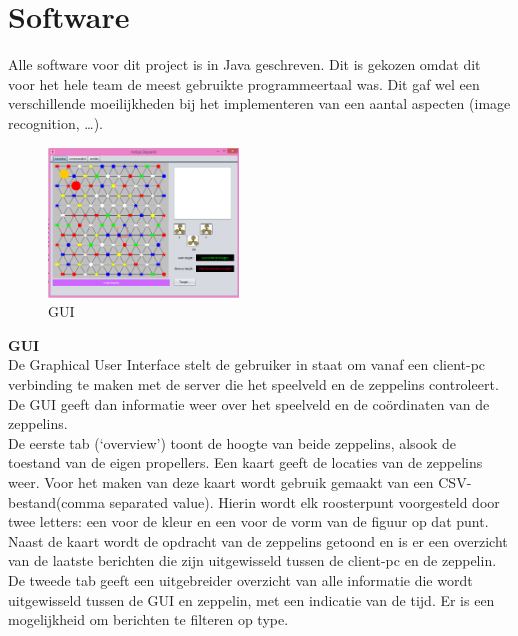 \documentclass[tt]{penoverslag}
\begin{document}
\section{Software}

Alle software voor dit project is in Java geschreven. Dit is gekozen omdat dit voor het hele team de meest gebruikte programmeertaal was. Dit gaf wel een verschillende moeilijkheden bij het implementeren van een aantal aspecten (image recognition, \ldots). \\

\begin{figure}[H]
\begin{center}
\includegraphics[width=0.45\textwidth]{GUI.png}
\end{center}
\caption{GUI}
\label{GUI}
\end{figure}

\textbf{GUI} \\
De Graphical User Interface stelt de gebruiker in staat om vanaf een client-pc verbinding te maken met de server die het speelveld en de zeppelins controleert. De GUI geeft dan informatie weer over het speelveld en de co\"{o}rdinaten van de zeppelins.  \\

De eerste tab (`overview') toont de hoogte van beide zeppelins, alsook de toestand van de eigen propellers. Een kaart geeft de locaties van de zeppelins weer. Voor het maken van deze kaart wordt gebruik gemaakt van een CSV-bestand(comma separated value). Hierin wordt elk roosterpunt voorgesteld door twee letters: een voor de kleur en een voor de vorm van de figuur op dat punt. Naast de kaart wordt de opdracht van de zeppelins getoond en is er een overzicht van de laatste berichten die zijn uitgewisseld tussen de client-pc en de zeppelin. \\

De tweede tab geeft een uitgebreider overzicht van alle informatie die wordt uitgewisseld tussen de GUI en zeppelin, met een indicatie van de tijd. Er is een mogelijkheid om berichten te filteren op type. \\
\end{document}
